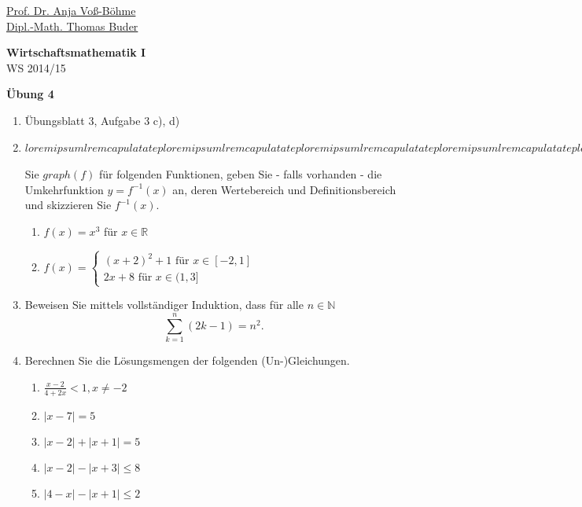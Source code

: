 \documentclass[12pt,a4paper]{scrreprt}
\newcommand{\N}{\mathds{N}}
\newcommand{\R}{\mathds{R}}
\begin{document}
 
\begin{flushleft}
\href{mailto:anja.voss-boehme@htw-dresden.de}{Prof. Dr. Anja Voß-Böhme} \\
\href{mailto:buder@htw-dresden.de}{Dipl.-Math. Thomas Buder}
\end{flushleft}

\begin{center}
\large{\textbf{ Wirtschaftsmathematik I}} \\
WS 2014/15 \end{center}

\begin{center}\large{\textbf{ Übung 4 }} \end{center}

\bigskip
\begin{enumerate}
\item Übungsblatt 3, Aufgabe 3 c), d)
\item $lorem ipsum lrem capula tatep lorem ipsum lrem capula tatep lorem ipsum lrem capula tatep lorem ipsum lrem capula tatep lorem ipsum lrem capula tatep lorem ipsum lrem capula tatep lorem ipsum lrem capula tatep lorem ipsum lrem capula tatep lorem ipsum lrem capula tatep lorem ipsum lrem capula tatep lorem ipsum lrem capula tatep lorem ipsum lrem capula tatep lorem ipsum lrem capula tatep lorem ipsum lrem capula tatep lorem ipsum lrem capula tatep \underbrace{Skizzieren}_{ein sehr langer text verschiebt die umgebung} lorem ipsum lrem capula tatep lorem ipsum lrem capula tatep lorem ipsum lrem capula tatep lorem ipsum lrem capula tatep lorem ipsum lrem capula tatep lorem ipsum lrem capula tatep lorem ipsum lrem capula tatep lorem ipsum lrem capula tatep lorem ipsum lrem capula tatep lorem ipsum lrem capula tatep lorem ipsum lrem capula tatep lorem ipsum lrem capula tatep lorem ipsum lrem capula tatep lorem ipsum lrem capula tatep lorem ipsum lrem capula tatep  $ Sie $graph(f)$ für folgenden Funktionen, geben Sie  - falls vorhanden - die Umkehrfunktion $y=f^{-1}(x)$ an,  deren Wertebereich und Definitionsbereich und skizzieren Sie $f^{-1}(x)$.
		\begin{enumerate}
			\item $f(x)=x^3$ für $x \in \R$
			\item $f(x)= \begin{cases}
													(x+2)^2+1 \text{ für  } x \in [-2,1] \\
													2x+8 \text{ für  } x \in (1,3]
										\end{cases}$
			\end{enumerate}
\item Beweisen Sie mittels vollständiger Induktion, dass für alle $n \in \N$ \[ \sum\limits_{k=1}^n (2k-1) = n^2.\]
\item Berechnen Sie die Lösungsmengen der folgenden (Un-)Gleichungen.
			\begin{enumerate}
			  \item $\frac{x-2}{4+2x} < 1,  x \neq -2$
				\item $|x-7| = 5$
				\item $|x-2| + |x+1| = 5$
				\item $|x - 2| - |x + 3| \leq 8$
				\item $|4 - x| - |x + 1| \leq 2$



\end{enumerate}
\end{enumerate}
\end{document}
